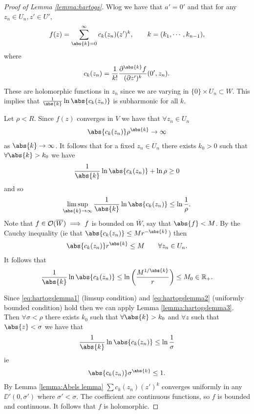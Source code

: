 \begin{proof}[Proof of Lemma \ref{lemma:hartogs}]
    Wlog we have that $a' = 0' $ and that for any $z_n \in U_n, z' \in U'$,
    \begin{align*}
        f(z)  = \sum_{\abs{k} = 0}^\infty c_k(z_n) (z')^k, \qquad k = (k_1 , \cdots, k_{n-1}),
    \end{align*}
    where
    \begin{align*}
        c_k (z_n ) = \frac{1}{k!} \frac{\partial^{\abs{k}} f }{(\partial z')^{k}}(0',z_n).
    \end{align*}
    These are holomorphic functions in $z_n$ since we are varying in $\{ 0 \} \times U_n \subset W$. This implies that $\frac{1}{\abs{k} } \ln{ \abs{c_k (z_n) } }$ is subharmonic for all $k$.

    Let $\rho < R$. Since $f(z) $ converges in $V$ we have that $\forall z_n \in U_n$
    \begin{align*}
        \abs{c_k (z_n) } \rho^{\abs{k}} \to  \infty
    \end{align*}
    as $\abs{k} \to \infty$. It follows that for a fixed $z_n \in U_n$ there exists $k_0 > 0$ such that $\forall \abs{k} > k_0$ we have
    \begin{align*}
        \frac{1}{\abs{k}} \ln{ \abs{c_k (z_n)} } + \ln{\rho} \geq 0
    \end{align*}
    and so
    \begin{align}\label{eq:hartogslemma1}
        \limsup_{\abs{k} \to \infty} \frac{1}{\abs{k}} \ln{ \abs{c_k (z_n)} } \leq \ln{\frac{1}{\rho}}.
    \end{align}
    Note that $f \in \mathcal{O}(\overline{W}) \implies f$ is bounded on $\overline{W}$, say that $\abs{f} < M$. By the Cauchy inequality (ie that $\abs{c_k (z_n)} \leq Mr^{-\abs{k}}$) then 
    \begin{align*}
        \abs{c_k (z_n) } r^{\abs{k}} \leq M \qquad \forall z_n \in U_n.
    \end{align*}
    It follows that
    \begin{align}\label{eq:hartogslemma2}
        \frac{1}{\abs{k} } \ln{ \abs{c_k(z_n) }} \leq \ln{ \br{\frac{M^{1/\abs{k}}}{r}} } \leq M_0 \in \R_{+}.
    \end{align}

    Since \ref{eq:hartogslemma1} (limsup condition) and \ref{eq:hartogslemma2} (uniformly bounded condition) hold then we can apply Lemma \ref{lemma:hartogslemma3}. Then $\forall \sigma < \rho$ there exists $k_0$ such that $\forall \abs{k} > k_0$ and $\forall z $ such that $\abs{z} < \sigma$ we have that
    \begin{align*}
        \frac{1}{\abs{k}} \ln{ \abs{c_k(z_n)} } \leq \ln{ \frac{1}{\sigma} }
    \end{align*}
    ie
    \begin{align*}
        \abs{c_k(z_n) } \sigma^{\abs{k}} \leq 1.
    \end{align*}
    By Lemma \ref{lemma:Abels lemma} $\sum c_k(z_n) (z')^k$ converges uniformly in any $\DD'(0,\sigma') $ where $\sigma' < \sigma$. The coefficient are continuous functions, so $f$ is bounded and continuous. It follows that $f$ is holomorphic.
\end{proof}

